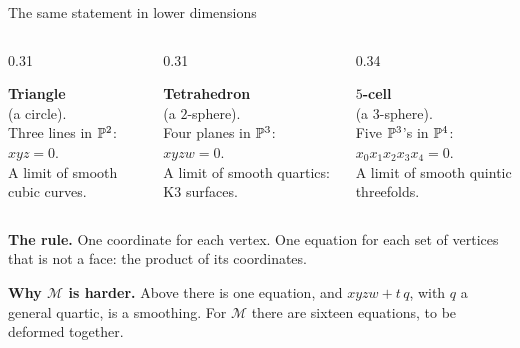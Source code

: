 \begin{frame}{The same statement in lower dimensions}
\begin{columns}[t]
\begin{column}{0.31\textwidth}\centering
{}
\par\smallskip
\textbf{Triangle}\\ (a circle).\\ Three lines in \(\mathbb P^2\):\\ \(xyz=0\).\\ A limit of smooth cubic curves.
\end{column}
\begin{column}{0.31\textwidth}\centering
{}
\par\smallskip
\textbf{Tetrahedron}\\ (a \(2\)-sphere).\\ Four planes in \(\mathbb P^3\):\\ \(xyzw=0\).\\ A limit of smooth quartics: K3 surfaces.
\end{column}
\begin{column}{0.34\textwidth}\centering
{}
\par\smallskip
\textbf{\(5\)-cell}\\ (a \(3\)-sphere).\\ Five \(\mathbb P^3\)'s in \(\mathbb P^4\):\\ \(x_0x_1x_2x_3x_4=0\).\\ A limit of smooth quintic threefolds.
\end{column}
\end{columns}
\par\smallskip
\textbf{The rule.} One coordinate for each vertex. One equation for each set of vertices that is not a face: the product of its coordinates.
\par
\textbf{Why \(\mathcal M\) is harder.} Above there is one equation, and \(xyzw+t\,q\), with \(q\) a general quartic, is a smoothing. For \(\mathcal M\) there are sixteen equations, to be deformed together.
\end{frame}


